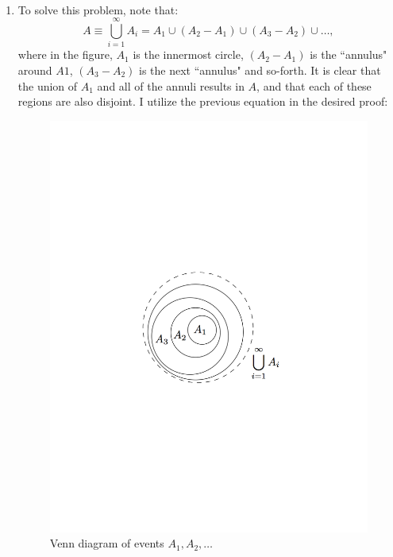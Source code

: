 \begin{problem}{20} $ $

\begin{enumerate}
\item To solve this problem, note that:
	\begin{equation*}
		A\equiv \bigcup_{i=1}^{\infty}A_i = A_1 \cup (A_2-A_1) \cup (A_3-A_2) \cup \ldots, 
	\end{equation*}
where in the figure, $A_1$ is the innermost circle, $(A_2-A_1)$ is the ``annulus" around $A1$, $(A_3-A_2)$ is the next ``annulus" and so-forth.  It is clear that the union of $A_1$ and all of the annuli results in $A$, and that each of these regions are also disjoint.  I utilize the previous equation in the desired proof:
	\begin{figure}[t]
	\centering
      		 \includegraphics[totalheight=6cm]{chpt1/prob20.pdf}
  			  \caption{Venn diagram of events $A_1, A_2, \ldots$}
    			   \label{fig:prob_20}
	\end{figure}
	

\end{enumerate}
\end{problem}
